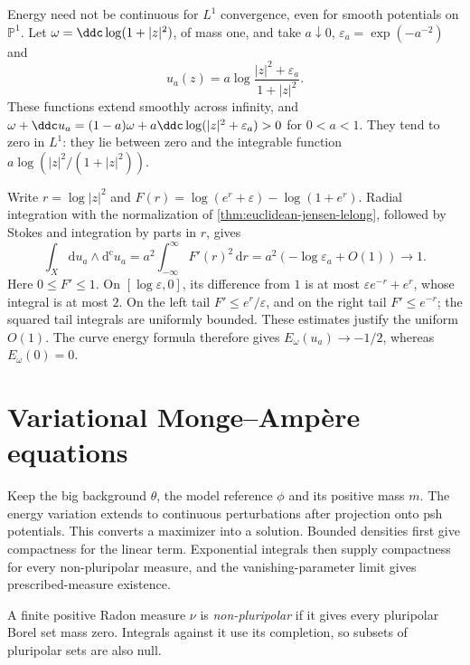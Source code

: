 \begin{example}\label{ex:lone-convergence-energy-drop}
Energy need not be continuous for $L^1$ convergence, even for smooth potentials on $\mathbb P^1$. Let $\omega=\ddc\log(1+|z|^2)$, of mass one, and take $a\downarrow0$, $\varepsilon_a=\exp(-a^{-2})$ and
\[
 u_a(z)=a\log\frac{|z|^2+\varepsilon_a}{1+|z|^2}.
\]
These functions extend smoothly across infinity, and
$\omega+\ddc u_a=(1-a)\omega+a\ddc\log(|z|^2+\varepsilon_a)>0$ for $0<a<1$. They tend to zero in $L^1$: they lie between zero and the integrable function $a\log(|z|^2/(1+|z|^2))$.

Write $r=\log|z|^2$ and $F(r)=\log(e^r+\varepsilon)-\log(1+e^r)$. Radial integration with the normalization of \cref{thm:euclidean-jensen-lelong}, followed by Stokes and integration by parts in $r$, gives
\[
 \int_X\mathrm du_a\wedge\mathrm d^{\mathrm c}u_a
             =a^2\int_{-\infty}^\infty F'(r)^2\,\mathrm dr
             =a^2(-\log\varepsilon_a+O(1))\longrightarrow1.
\]
Here $0\leq F'\leq1$. On $[\log\varepsilon,0]$, its difference from $1$ is at most $\varepsilon e^{-r}+e^r$, whose integral is at most $2$. On the left tail $F'\leq e^r/\varepsilon$, and on the right tail $F'\leq e^{-r}$; the squared tail integrals are uniformly bounded. These estimates justify the uniform $O(1)$. The curve energy formula therefore gives $E_\omega(u_a)\to-1/2$, whereas $E_\omega(0)=0$.
\end{example}

\section{Variational Monge--Amp\`ere equations}
\label{sec:relative-variational-equations}
Keep the big background $\theta$, the model reference $\phi$ and its positive mass $m$. The energy variation extends to continuous perturbations after projection onto psh potentials. This converts a maximizer into a solution. Bounded densities first give compactness for the linear term. Exponential integrals then supply compactness for every non-pluripolar measure, and the vanishing-parameter limit gives prescribed-measure existence.

\begin{definition}\label{def:nonpluripolar-radon-measure}
A finite positive Radon measure $\nu$ is \emph{non-pluripolar} if it gives every pluripolar Borel set mass zero. Integrals against it use its completion, so subsets of pluripolar sets are also null.
\end{definition}

